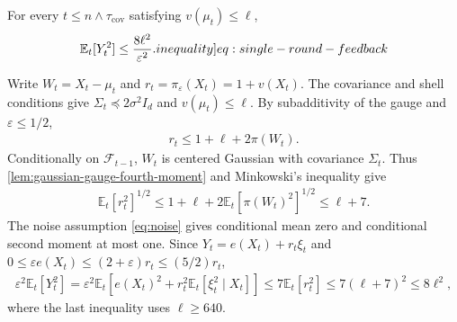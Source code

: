\documentclass[12pt,cleveref]{jmlr}
\renewenvironment{proof}[1][\proofname]
{\par\noindent{\bfseries\upshape #1\ }}
{\jmlrQED}
\newcommand{\ineqlabel}[1]{\label[inequality]{#1}}
\newcommand{\E}{\mathbb E}
\newcommand{\F}{\mathcal F}
\newcommand{\1}{\mathbf 1}
\newcommand{\eps}{\varepsilon}
\begin{document}
\begin{lemma}
    \label{lem:single-round-feedback}
    For every $t\leq n\wedge\tau_{\mathrm{cov}}$ satisfying
    $v(\mu_t)\leq\ell$,
    \begin{align}
        \E_t[Y_t^2]\leq\frac{8\ell^2}{\eps^2}.
        \ineqlabel{eq:single-round-feedback}
    \end{align}
\end{lemma}
\begin{proof}
    Write $W_t=X_t-\mu_t$ and $r_t=\pi_\eps(X_t)=1+v(X_t)$.
    The covariance and shell conditions give
    $\Sigma_t\preceq2\sigma^2I_d$ and $v(\mu_t)\leq\ell$.
    By subadditivity of the gauge and $\eps\leq1/2$,
    \begin{align}
        r_t\leq1+\ell+2\pi(W_t).
    \end{align}
    Conditionally on $\F_{t-1}$, $W_t$ is centered Gaussian with
    covariance $\Sigma_t$. Thus
    \cref{lem:gaussian-gauge-fourth-moment} and Minkowski's inequality give
    \begin{align}
        \E_t[r_t^2]^{1/2}
        \leq1+\ell+2\E_t[\pi(W_t)^2]^{1/2}
        \leq\ell+7.
    \end{align}
    The noise assumption \cref{eq:noise} gives conditional mean zero
    and conditional second moment at most one. Since
    $Y_t=e(X_t)+r_t\xi_t$ and
    $0\leq\eps e(X_t)\leq(2+\eps)r_t\leq(5/2)r_t$,
    \begin{align}
        \eps^2\E_t[Y_t^2]
        =\eps^2\E_t\left[e(X_t)^2+r_t^2\E_t[\xi_t^2\mid X_t]\right]
        \leq7\E_t[r_t^2]
        \leq7(\ell+7)^2
        \leq8\ell^2,
    \end{align}
    where the last inequality uses $\ell\geq640$.
\end{proof}
\end{document}
